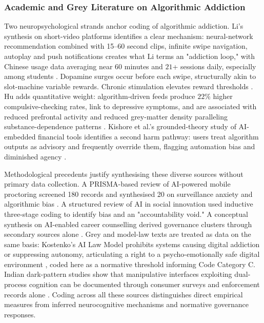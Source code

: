 \documentclass[11pt]{article}
\begin{document}
\subsubsection{Academic and Grey Literature on Algorithmic Addiction}
\label{sec:academic_grey_addiction} Two neuropsychological strands anchor coding of algorithmic addiction. Li's synthesis on short-video platforms identifies a clear mechanism: neural-network recommendation combined with 15--60 second clips, infinite swipe navigation, autoplay and push notifications creates what Li terms an "addiction loop," with Chinese usage data averaging near $60$ minutes and $21$+ sessions daily, especially among students \parencites[2]{8958037}[3]{8958037}. Dopamine surges occur before each swipe, structurally akin to slot-machine variable rewards. Chronic stimulation elevates reward thresholds \parencites[3]{8958037}[4]{8958037}. Hu adds quantitative weight: algorithm-driven feeds produce $22\%$ higher compulsive-checking rates, link to depressive symptoms, and are associated with reduced prefrontal activity and reduced grey-matter density paralleling substance-dependence patterns \parencites[2]{3303310}[20]{3303310}. Kishore et al.'s grounded-theory study of AI-embedded financial tools identifies a second harm pathway: users treat algorithm outputs as advisory and frequently override them, flagging automation bias and diminished agency \parencites[7]{4245543}[6]{4245543}.

Methodological precedents justify synthesising these diverse sources without primary data collection. A PRISMA-based review of AI-powered mobile proctoring screened 180 records and synthesised 20 on surveillance anxiety and algorithmic bias \parencites[2]{2055956}[9]{2055956}. A structured review of AI in social innovation \parencites[3]{4246340} used inductive three-stage coding to identify bias and an "accountability void." A conceptual synthesis on AI-enabled career counselling derived governance clusters through secondary sources alone \parencites[14]{9762591}. Grey and model-law texts are treated as data on the same basis: Kostenko's AI Law Model prohibits systems causing digital addiction or suppressing autonomy, articulating a right to a psycho-emotionally safe digital environment \parencites[61--62]{2977039}[119]{2977039}, coded here as a normative threshold informing Code Category C. Indian dark-pattern studies show that manipulative interfaces exploiting dual-process cognition can be documented through consumer surveys and enforcement records alone \parencites[6]{6295677}[7]{6295677}. Coding across all these sources distinguishes direct empirical measures from inferred neurocognitive mechanisms and normative governance responses.
\end{document}
